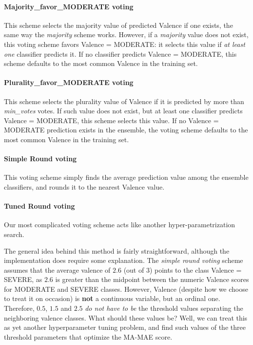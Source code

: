 \paragraph{Majority\_favor\_MODERATE voting} 
This scheme selects the majority
value of predicted \textsf{Valence} if one exists, 
the same way the \textit{majority} scheme works.
However, if a \textit{majority} value does not exist, this voting
scheme favors \textsf{Valence = MODERATE}: it selects this value if \textit{at least one}
classifier predicts it. If no classifier predicts \textsf{Valence = MODERATE}, 
this scheme defaults to the most common \textsf{Valence} in the training set.

\paragraph{Plurality\_favor\_MODERATE voting} 
This scheme selects
the plurality value of \textsf{Valence} if it is predicted by more than
\textit{min\_votes} votes. If such value does not exist, but at least
one classifier predicts \textsf{Valence = MODERATE}, this scheme selects this value.
If no \textsf{Valence = MODERATE} prediction exists in the ensemble, 
the voting scheme defaults to the most common \textsf{Valence} in the training set.

\paragraph{Simple Round voting}  This voting scheme simply finds
the average prediction value among the ensemble classifiers,
and rounds it to the nearest \textsf{Valence} value.

\paragraph{Tuned Round voting}

Our most complicated voting scheme acts like another hyper-parametrization search.

The general idea behind this method is fairly straightforward, although the implementation
does require some explanation.  The \textit{simple round voting} scheme assumes
that the average valence of $2.6$ (out of $3$) points to the class \textsf{Valence = SEVERE},
as $2.6$ is greater than the midpoint between the numeric \textsf{Valence} scores for
\textsf{MODERATE} and \textsf{SEVERE} classes. However, \textsf{Valence} (despite
how we choose to treat it on occasion) is \textbf{not} a continuous variable, but
an ordinal one.  Therefore, $0.5$, $1.5$ and $2.5$ \textit{do not have to be} the threshold
values separating the neighboring valence classes.  What should these values be?
Well, we can treat this as yet another hyperparameter tuning problem, and find
such values of the three threshold parameters that optimize the \textsf{MA-MAE} score.

